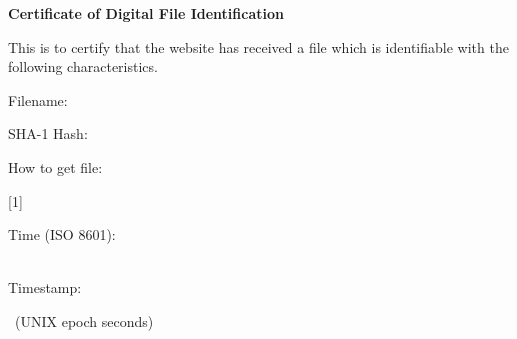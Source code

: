 \documentclass[a4paper,12pt]{article}
\begin{document}
\begin{center}
    \Huge\bfseries%
    {Certificate of Digital File Identification}
\end{center}
\bigskip
\bigskip
\sloppy

\large
This is to certify that the website has received a file
which is identifiable with the following characteristics.
\normalsize
\bigskip


Filename:

{\sffamily\Large\bfseries\strut\METADATAbasename}
\bigskip



SHA-1 Hash:

{\sffamily\strut\METADATAhash}
\bigskip



How to get file:

\scalebox{0.9}[1]{\sffamily\strut\href{\METADATAurlbyhash}{\METADATAurlbyhash}}
\bigskip
\bigskip



\qrcode[height=32mm]{\METADATAurlbyhash}



\vfill

Time (ISO 8601): \strut\METADATAtimeiso\\
Timestamp: \strut\METADATAtimestamp~(UNIX epoch seconds)
\end{document}
